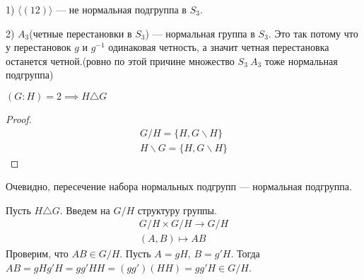 \documentclass[../main.tex]{subfiles}
\begin{document}
\begin{examples}
    1) $\langle (1 2) \rangle$ --- не нормальная подгруппа в $S_3$.

    2) $A_3$(четные перестановки в $S_3$) --- нормальная группа в $S_3$. Это так потому что у перестановок $g$ и $g^{-1}$ одинаковая четность, а значит четная перестановка останется четной.(ровно по этой причине множество $S_3 \ A_3$ тоже нормальная подгруппа)
\end{examples}
\begin{remark}
    $(G : H) = 2 \implies H \triangle G$
\end{remark}
\begin{proof}
    \begin{equation*}
        \begin{gathered}
            G / H = \{H, G \backslash H\}\\
            H \backslash G = \{H, G \backslash H\}
        \end{gathered}
    \end{equation*}
\end{proof}

\begin{remark}
Очевидно, пересечение набора нормальных подгрупп --- нормальная подгруппа.
\end{remark}

Пусть $H \triangle G$. Введем на $G / H$ структуру группы.
\begin{equation*}
    \begin{gathered}
        G/H \times G/H \to G/H \\
        (A, B) \mapsto AB
    \end{gathered}
\end{equation*}
Проверим, что $AB \in G/H$. Пусть $A = gH, \, B = g'H$. Тогда $AB = gHg'H = gg'HH = (gg')(HH) = gg'H \in G/H$.
\end{document}
